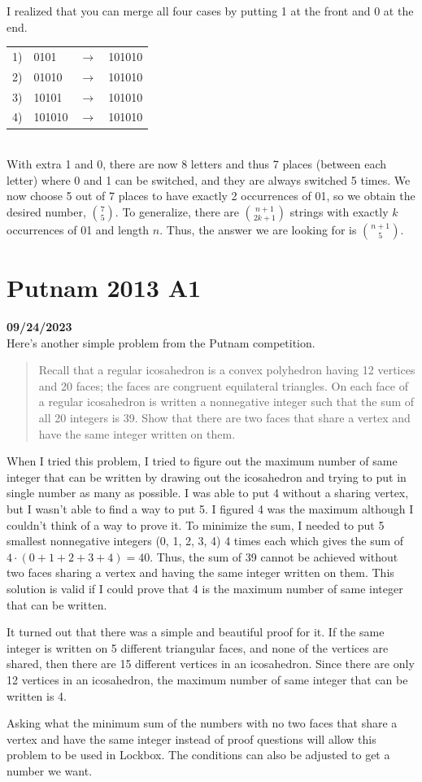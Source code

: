 \documentclass[12pt, oneside]{article}
\begin{document}
\noindent I realized that you can merge all four cases by putting 1 at the front and 0 at the end.\\

\begin{tabular}{c l c l}
1) & 0101 & $\rightarrow$ & 101010\\
2) & 01010 & $\rightarrow$ & 101010\\
3) & 10101 & $\rightarrow$ & 101010\\
4) & 101010 & $\rightarrow$ & 101010\\
\end{tabular}\\

\noindent With extra 1 and 0, there are now 8 letters and thus 7 places (between each letter) where 0 and 1 can be switched, and they are always switched 5 times. We now choose 5 out of 7 places to have exactly 2 occurrences of 01, so we obtain the desired number, $\binom{7}{5}$. To generalize, there are $\binom{n+1}{2k+1}$ strings with exactly $k$ occurrences of 01 and length $n$. Thus, the answer we are looking for is $\binom{n+1}{5}$.
\section*{Putnam 2013 A1}
\textbf{09/24/2023}\\
Here's another simple problem from the Putnam competition. 
\begin{quote}
Recall that a regular icosahedron is a convex polyhedron having 12 vertices and 20 faces; the faces are congruent equilateral triangles. On each face of a regular
icosahedron is written a nonnegative integer such that
the sum of all 20 integers is 39. Show that there are
two faces that share a vertex and have the same integer
written on them.
\end{quote}
When I tried this problem, I tried to figure out the maximum number of same integer that can be written by drawing out the icosahedron and trying to put in single number as many as possible. I was able to put 4 without a sharing vertex, but I wasn't able to find a way to put 5. I figured 4 was the maximum although I couldn't think of a way to prove it. To minimize the sum, I needed to put 5 smallest nonnegative integers (0, 1, 2, 3, 4) 4 times each which gives the sum of $4 \cdot (0 + 1 + 2 + 3 + 4) = 40$. Thus, the sum of 39 cannot be achieved without two faces sharing a vertex and having the same integer written on them. This solution is valid if I could prove that 4 is the maximum number of same integer that can be written.

It turned out that there was a simple and beautiful proof for it. If the same integer is written on 5 different triangular faces, and none of the vertices are shared, then there are 15 different vertices in an icosahedron. Since there are only 12 vertices in an icosahedron,  the maximum number of same integer that can be written is 4.

Asking what the minimum sum of the numbers with no two faces that share a vertex and have the same integer instead of proof questions will allow this problem to be used in Lockbox. The conditions can also be adjusted to get a number we want.
\end{document}
